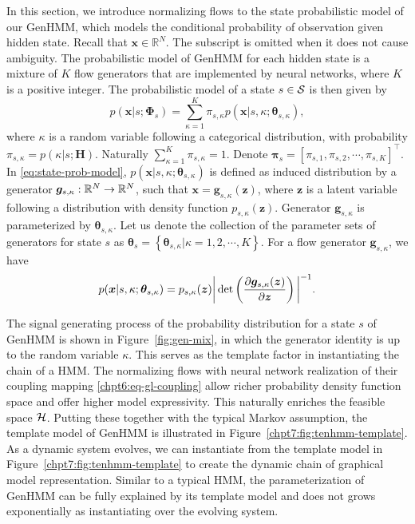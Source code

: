 In this section, we introduce normalizing flows to the state probabilistic model of our GenHMM, which models the conditional probability of observation given hidden state.
Recall that $\bm{x}\in\mathbb{R}^N$. The subscript is omitted when it does not cause ambiguity.
The probabilistic model of GenHMM for each hidden state is a mixture of $K$ flow generators that are implemented by neural networks, where $K$ is a positive integer.
The probabilistic model of a state $s\in\mathcal{S}$ is then given by
\begin{equation}\label{eq:state-prob-model}
  p(\bm{x}| s; \bm{\Phi}_{s}) = \sum_{\kappa=1}^{K}\pi_{s, \kappa} p(\bm{x}| s, \kappa; \bm{\theta}_{s, \kappa}),
\end{equation}
where $\kappa$ is a random variable following a categorical distribution, with probability $\pi_{s, \kappa} = p(\kappa | s; \bm{H})$.
Naturally $\sum_{\kappa = 1}^{K} \pi_{s, \kappa}= 1$. Denote $\bm{\pi}_{s} = [\pi_{s,1}, \pi_{s,2}, \cdots, \pi_{s,K}]^{\intercal}$. 
In \eqref{eq:state-prob-model}, $p(\bm{x}| s, \kappa; \bm{\theta}_{s, \kappa})$ is defined as induced distribution by a generator $\bm{g}_{s,\kappa}: \mathbb{R}^{N}\rightarrow\mathbb{R}^{N}$, such that $\bm{x}=\bm{g}_{s, \kappa}(\bm{z})$, where $\bm{z}$ is a latent variable following a distribution with density function $p_{s,\kappa}(\bm{z})$. Generator $\bm{g}_{s,\kappa}$ is parameterized by $\bm{\theta}_{s, \kappa}$. Let us denote the collection of the parameter sets of generators for state $s$ as $\bm{\theta}_s = \left\{ \bm{\theta}_{s, \kappa}| \kappa = 1, 2, \cdots, K \right\}$. For a flow generator $\bm{g}_{s, \kappa}$, we have
\begin{equation}\label{chpt7:eq:change-variable}
  p(\bm{x}| s, \kappa; \bm{\theta}_{s, \kappa}) = p_{s,\kappa}(\bm{z})\bigg| \det\left( \frac{ \partial \bm{g}_{s,\kappa}(\bm{z})}{\partial \bm{z}} \right)\bigg|^{-1}.
\end{equation}

The signal generating process of the probability distribution for a state $s$ of GenHMM is shown in Figure~\ref{fig:gen-mix}, in which the generator identity is up to the random variable $\kappa$. This serves as the template factor in instantiating the chain of a HMM. The normalizing flows with neural network realization of their coupling mapping \eqref{chpt6:eq-gl-coupling} allow richer probability density function space and offer higher model expressivity. This naturally enriches the feasible space $\mathcal{H}$. Putting these together with the typical Markov assumption, the template model of GenHMM is illustrated in Figure~\ref{chpt7:fig:tenhmm-template}. As a dynamic system evolves, we can instantiate from the template model in Figure~\ref{chpt7:fig:tenhmm-template} to create the dynamic chain of graphical model representation. Similar to a typical HMM, the parameterization of GenHMM can be fully explained by its template model and does not grows exponentially as instantiating over the evolving system.

